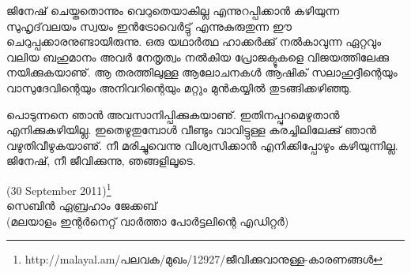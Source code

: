 ജിനേഷ് ചെയ്തതൊന്നും വെറുതെയാകില്ല എന്നുറപ്പിക്കാന്‍ കഴിയുന്ന സുഹൃദ്‌വലയം സ്വയം ഇന്‍ട്രോവെര്‍ട്ടു് എന്നുകുരുതുന്ന 
ഈ ചെറുപ്പക്കാരനുണ്ടായിരുന്നു. ഒരു യഥാര്‍ത്ഥ ഹാക്കര്‍ക്കു് നല്‍കാവുന്ന ഏറ്റവും വലിയ ബഹുമാനം അവര്‍ നേതൃത്വം 
നല്‍കിയ പ്രോജക്ടുകളെ വിജയത്തിലേക്കു നയിക്കുകയാണു്. ആ തരത്തിലുള്ള ആലോചനകള്‍ ആഷിക്‍ സലാഹുദ്ദീന്റെയും 
വാസുദേവിന്റെയും അനിവറിന്റെയും മറ്റും മുന്‍കയ്യില്‍ തുടങ്ങിക്കഴിഞ്ഞു.

പൊടുന്നനെ ഞാന്‍ അവസാനിപ്പിക്കുകയാണു്. ഇതിനപ്പുറമെഴുതാന്‍ എനിക്കുകഴിയില്ല. ഇതെഴുതുമ്പോള്‍ വീണ്ടും വാവിട്ടുള്ള 
കരച്ചിലിലേക്കു് ഞാന്‍ വഴുതിവീഴുകയാണു്. നീ മരിച്ചുവെന്നു വിശ്വസിക്കാന്‍ എനിക്കിപ്പോഴും കഴിയുന്നില്ല. ജിനേഷ്, നീ ജീവിക്കുന്നു, 
ഞങ്ങളിലൂടെ.

\begin{flushright}(30  September 2011)\footnote{http://malayal.am/പലവക/മുഖം/12927/ജീവിക്കുവാനുള്ള-കാരണങ്ങള്‍}\\സെബിന്‍ ഏബ്രഹാം ജേക്കബ്\\ (മലയാളം ഇന്റര്‍നെറ്റ് വാര്‍ത്താ പോര്‍ട്ടലിന്റെ എഡിറ്റര്‍)\end{flushright}

\newpage
